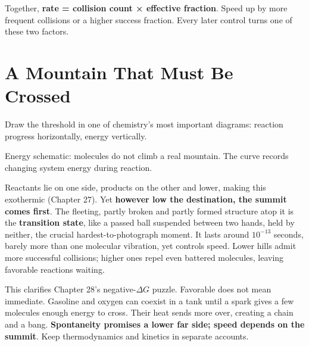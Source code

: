 Together, \textbf{rate = collision count × effective fraction}. Speed up by more frequent collisions or a higher success fraction. Every later control turns one of these two factors.

\section{A Mountain That Must Be Crossed}

Draw the threshold in one of chemistry's most important diagrams: reaction progress horizontally, energy vertically.

\begin{center}

\footnotesize Energy schematic: molecules do not climb a real mountain. The curve records changing system energy during reaction.
\end{center}

Reactants lie on one side, products on the other and lower, making this exothermic (Chapter 27). Yet \textbf{however low the destination, the summit comes first}. The fleeting, partly broken and partly formed structure atop it is the \textbf{transition state}, like a passed ball suspended between two hands, held by neither, the crucial hardest-to-photograph moment. It lasts around $10^{-13}$ seconds, barely more than one molecular vibration, yet controls speed. Lower hills admit more successful collisions; higher ones repel even battered molecules, leaving favorable reactions waiting.

This clarifies Chapter 28's negative-$\Delta G$ puzzle. Favorable does not mean immediate. Gasoline and oxygen can coexist in a tank until a spark gives a few molecules enough energy to cross. Their heat sends more over, creating a chain and a bang. \textbf{Spontaneity promises a lower far side; speed depends on the summit}. Keep thermodynamics and kinetics in separate accounts.

